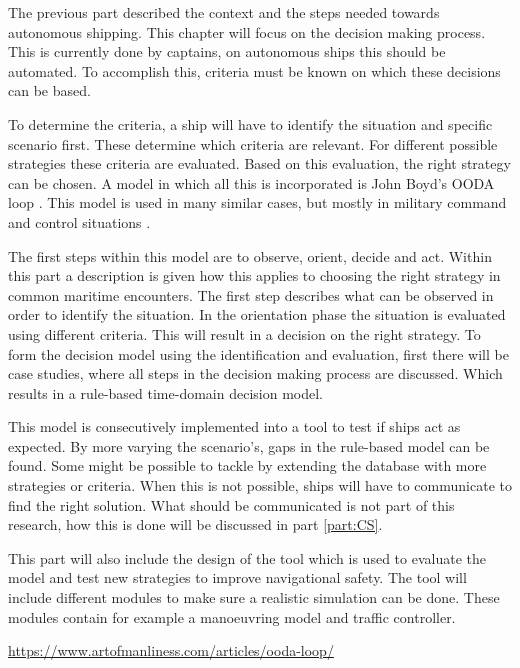The previous part described the context and the steps needed towards autonomous shipping. This chapter will focus on the decision making process. This is currently done by captains, on autonomous ships this should be automated. To accomplish this, criteria must be known on which these decisions can be based. 

To determine the criteria, a ship will have to identify the situation and specific scenario first. These determine which criteria are relevant. For different possible strategies these criteria are evaluated. Based on this evaluation, the right strategy can be chosen. A model in which all this is incorporated is John Boyd's OODA loop \cite{Boyd1987}. This model is used in many similar cases, but mostly in military command and control situations \cite{Arciszewski2009} \cite{Kalloniatis2017}.

The first steps within this model are to observe, orient, decide and act. Within this part a description is given how this applies to choosing the right strategy in common maritime encounters. The first step describes what can be observed in order to identify the situation. In the orientation phase the situation is evaluated using different criteria. This will result in a decision on the right strategy. To form the decision model using the identification and evaluation, first there will be case studies, where all steps in the decision making process are discussed. Which results in a rule-based time-domain decision model. 

This model is consecutively implemented into a tool to test if ships act as expected. By more varying the scenario's, gaps in the rule-based model can be found. Some might be possible to tackle by extending the database with more strategies or criteria. When this is not possible, ships will have to communicate to find the right solution. What should be communicated is not part of this research, how this is done will be discussed in part \ref{part:CS}.

This part will also include the design of the tool which is used to evaluate the model and test new strategies to improve navigational safety. The tool will include different modules to make sure a realistic simulation can be done. These modules contain for example a manoeuvring model and traffic controller.

\url{https://www.artofmanliness.com/articles/ooda-loop/} 